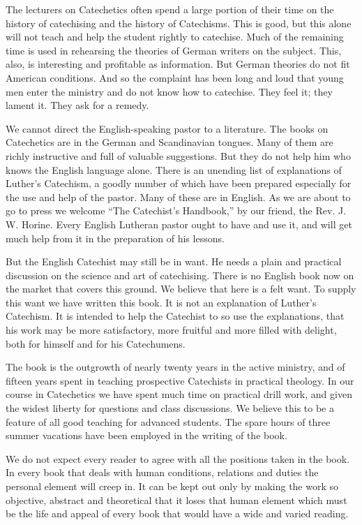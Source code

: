The lecturers on Catechetics often spend a large portion of their time on the history of catechising and the history of Catechisms. This is good, but this alone will not teach and help the student rightly to catechise. Much of the remaining time is used in rehearsing the theories of German writers on the subject. This, also, is interesting and profitable as information. But German theories do not fit American conditions. And so the complaint has been long and loud that young men enter the ministry and do not know how to catechise. They feel it; they lament it. They ask for a remedy.

We cannot direct the English-speaking pastor to a literature. The books on Catechetics are in the German and Scandinavian tongues. Many of them are richly instructive and full of valuable suggestions.
But they do not help him who knows the English language alone.  There is an unending list of explanations of Luther’s Catechism, a goodly number of which have been prepared especially for the use and help of the pastor. Many of these are in English. As we are about to go to press we welcome “The Catechist’s Handbook,” by our friend, the Rev. J. W. Horine. Every English Lutheran pastor ought to have and use it, and will get much help from it in the preparation of his lessons.

But the English Catechist may still be in want. He needs a plain and practical discussion on the science and art of catechising. There is no English book now on the market that covers this ground. We believe that here is a felt want. To supply this want we have written this book. It is not an explanation of Luther’s Catechism. It is intended to help the Catechist to so use the explanations, that his work may be more satisfactory, more fruitful and more filled with delight, both for himself and for his Catechumens.

The book is the outgrowth of nearly twenty years in the active ministry, and of fifteen years spent in teaching prospective Catechists in practical theology. In our course in Catechetics we have spent much time on practical drill work, and given the widest liberty for questions and class discussions. We believe this to be a feature of all good
teaching for advanced students. The spare hours of three summer vacations have been employed in the writing of the book.

We do not expect every reader to agree with all the positions taken in the book. In every book that deals with human conditions, relations and duties the personal element will creep in. It can be kept out only by making the work so objective, abstract and theoretical that it loses that human element which must be the life and appeal of every book that would have a wide and varied reading.

